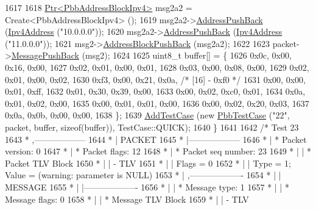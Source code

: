 \begin{DoxyCode}
1617 
1618     \hyperlink{classns3_1_1Ptr}{Ptr<PbbAddressBlockIpv4>} msg2a2 = Create<PbbAddressBlockIpv4> ();
1619     msg2a2->\hyperlink{classns3_1_1PbbAddressBlock_a7be545a53d69bd426dbebcf752ed8371}{AddressPushBack} (\hyperlink{classns3_1_1Ipv4Address}{Ipv4Address} (\textcolor{stringliteral}{"10.0.0.0"}));
1620     msg2a2->\hyperlink{classns3_1_1PbbAddressBlock_a7be545a53d69bd426dbebcf752ed8371}{AddressPushBack} (\hyperlink{classns3_1_1Ipv4Address}{Ipv4Address} (\textcolor{stringliteral}{"11.0.0.0"}));
1621     msg2->\hyperlink{classns3_1_1PbbMessage_a5f623bad2fb1adde7da885e1c92d5311}{AddressBlockPushBack} (msg2a2);
1622 
1623     packet->\hyperlink{classns3_1_1PbbPacket_a4a3170001ef758d9c9c4375b8f089826}{MessagePushBack} (msg2);
1624 
1625     uint8\_t buffer[] = \{
1626       0x0c, 0x00, 0x16, 0x00,
1627       0x02, 0x01, 0x00, 0x01,
1628       0x03, 0x00, 0x08, 0x00,
1629       0x02, 0x01, 0x00, 0x02,
1630       0xf3, 0x00, 0x21, 0x0a,   \textcolor{comment}{/* [16] - 0xf0 */}
1631       0x00, 0x00, 0x01, 0xff,
1632       0x01, 0x30, 0x39, 0x00,
1633       0x00, 0x02, 0xc0, 0x01,
1634       0x0a, 0x01, 0x02, 0x00,
1635       0x00, 0x01, 0x01, 0x00,
1636       0x00, 0x02, 0x20, 0x03,
1637       0x0a, 0x0b, 0x00, 0x00,
1638     \};
1639     \hyperlink{classns3_1_1TestCase_a3718088e3eefd5d6454569d2e0ddd835}{AddTestCase} (\textcolor{keyword}{new} \hyperlink{classPbbTestCase}{PbbTestCase} (\textcolor{stringliteral}{"22"}, packet, buffer, \textcolor{keyword}{sizeof}(buffer)), 
      TestCase::QUICK);
1640   \}
1641 
1642   \textcolor{comment}{/* Test 23}
1643 \textcolor{comment}{         * ,------------------}
1644 \textcolor{comment}{         * |  PACKET}
1645 \textcolor{comment}{         * |------------------}
1646 \textcolor{comment}{         * | * Packet version:    0}
1647 \textcolor{comment}{         * | * Packet flags:  12}
1648 \textcolor{comment}{         * | * Packet seq number: 23}
1649 \textcolor{comment}{         * |    | * Packet TLV Block}
1650 \textcolor{comment}{         * |    |     - TLV}
1651 \textcolor{comment}{         * |    |         Flags = 0}
1652 \textcolor{comment}{         * |    |         Type = 1; Value = (warning: parameter is NULL)}
1653 \textcolor{comment}{         * |    ,-------------------}
1654 \textcolor{comment}{         * |    |  MESSAGE}
1655 \textcolor{comment}{         * |    |-------------------}
1656 \textcolor{comment}{         * |    | * Message type:       1}
1657 \textcolor{comment}{         * |    | * Message flags:  0}
1658 \textcolor{comment}{         * |    | * Message TLV Block}
1659 \textcolor{comment}{         * |    |     - TLV}

\end{DoxyCode}
